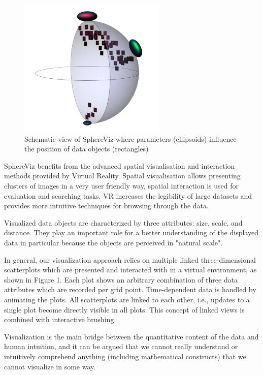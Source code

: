 \begin{figure}[h]
	\begin{center}
		\includegraphics[width=7cm]{03_Figures/05_LitReview/Soldati2007_SphereViz.png}
		\caption[Schematic view of SphereViz where parameters influence the position of data objects]{Schematic view of SphereViz where parameters (ellipsoids) influence the position of data objects (rectangles) \citep{Soldati2007}}
		\label{fig:sphereviz}
	\end{center}
\end{figure} 

SphereViz benefits from the advanced spatial visualisation and interaction methods provided by Virtual Reality. Spatial visualisation allows presenting clusters of images in a very user friendly way, spatial interaction is used for evaluation and searching tasks. VR increases the legibility of large datasets and provides more intuitive techniques for browsing through the data.
\cite{Soldati2007}

Visualized data objects are characterized by three attributes: size, scale, and distance. They play an important role for a better understanding of the displayed data in particular because the objects are perceived in "natural scale".
\cite{Soldati2007}

In general, our visualization approach relies on multiple linked three-dimensional scatterplots which are presented and interacted with in a virtual environment, as shown in Figure 1. Each plot shows an arbitrary combination of three data attributes which are recorded per grid point. Time-dependent data is handled by animating the plots. All scatterplots are linked to each other, i.e., updates to a single plot become directly visible in all plots. This concept of linked views is combined with interactive brushing.
\cite{Hentschel2009}

Visualization is the main bridge between the quantitative content of the data and human intuition, and it can be argued that we cannot really understand or intuitively comprehend anything (including mathematical constructs) that we cannot visualize in some way.
\cite{Donalek2014}

